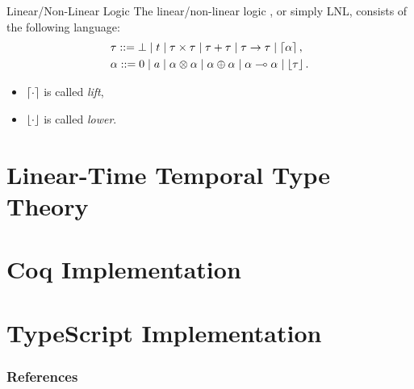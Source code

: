 \begin{frame}{Linear/Non-Linear Logic}
    The linear/non-linear logic \cite{DBLP:conf/csl/Benton94}, or simply LNL, consists of the following language:
    \begin{align*}
        &\tau ::= \bot \mid t \mid \tau \times \tau \mid \tau + \tau \mid \tau \rightarrow \tau \mid \left\lceil \alpha \right\rceil, \\
        &\alpha ::= 0 \mid a \mid \alpha \otimes \alpha \mid \alpha \oplus \alpha \mid \alpha \multimap \alpha \mid \left\lfloor \tau \right\rfloor.
    \end{align*}
    \begin{itemize}
        \item $\left\lceil \cdot \right\rceil$ is called \textit{lift},
        \item $\left\lfloor \cdot \right\rfloor$ is called \textit{lower}.
    \end{itemize}
\end{frame}

\section{Linear-Time Temporal Type Theory}

\section{Coq Implementation}

\section{TypeScript Implementation}

\begin{frame}[t,allowframebreaks]
\nocite{*}
\frametitle{References}


\end{frame}
